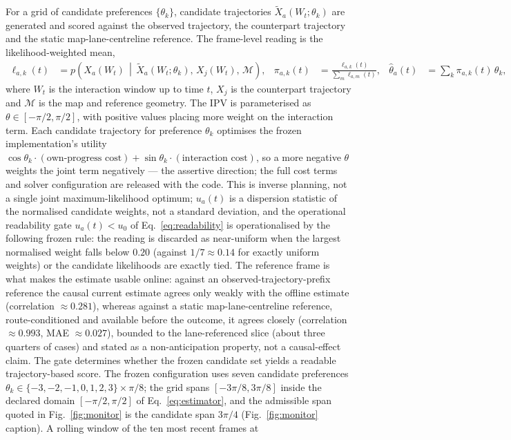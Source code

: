 \documentclass[12pt,a4paper]{article}
\begin{document}
For a grid of candidate preferences $\{\theta_k\}$, candidate trajectories
$\widetilde X_a(W_t;\theta_k)$ are generated and scored against the observed trajectory, the
counterpart trajectory and the static map-lane-centreline reference. The frame-level reading is the
likelihood-weighted mean,
\begin{align}
  \ell_{a,k}(t) &= p\!\left(X_a(W_t)\,\middle|\,\widetilde X_a(W_t;\theta_k),\,X_j(W_t),\,\mathcal{M}\right),
  & \pi_{a,k}(t) &= \frac{\ell_{a,k}(t)}{\sum_m \ell_{a,m}(t)},
  & \hat\theta_a(t) &= \sum_k \pi_{a,k}(t)\,\theta_k,
  \label{eq:estimator}
\end{align}
where $W_t$ is the interaction window up to time $t$, $X_j$ is the counterpart trajectory and
$\mathcal{M}$ is the map and reference geometry. The IPV is parameterised as
$\theta\in[-\pi/2,\pi/2]$, with positive values placing more weight on the interaction term.
Each candidate trajectory for preference $\theta_k$ optimises the frozen implementation's
utility $\cos\theta_k\cdot(\text{own-progress cost}) + \sin\theta_k\cdot(\text{interaction cost})$, so
a more negative $\theta$ weights the joint term negatively --- the assertive direction; the full cost
terms and solver configuration are released with the code. This is inverse planning, not a single
joint maximum-likelihood optimum; $u_a(t)$ is a dispersion
statistic of the normalised candidate weights, not a standard deviation, and the operational readability gate
$u_a(t)<u_0$ of Eq.~\eqref{eq:readability} is operationalised by the following frozen rule: the
reading is discarded as near-uniform when the largest normalised weight falls below $0.20$ (against
$1/7\approx0.14$ for exactly uniform weights) or the candidate likelihoods are exactly tied. The
reference frame is what makes the estimate usable online: against an observed-trajectory-prefix
reference the causal current estimate agrees only weakly with the offline estimate (correlation
$\approx 0.281$), whereas against a static map-lane-centreline reference, route-conditioned and
available before the outcome, it agrees closely (correlation $\approx 0.993$, MAE $\approx 0.027$),
bounded to the lane-referenced slice (about three quarters of cases) and stated as a non-anticipation
property, not a causal-effect claim. The gate determines whether the frozen candidate set yields a readable trajectory-based score. The frozen configuration uses seven candidate preferences
$\theta_k\in\{-3,-2,-1,0,1,2,3\}\times\pi/8$; the grid spans $[-3\pi/8,3\pi/8]$ inside the declared domain $[-\pi/2,\pi/2]$ of Eq.~\ref{eq:estimator}, and the admissible span quoted in Fig.~\ref{fig:monitor} is the candidate span $3\pi/4$ (Fig.~\ref{fig:monitor} caption). A rolling window of the ten most recent frames at
\end{document}
